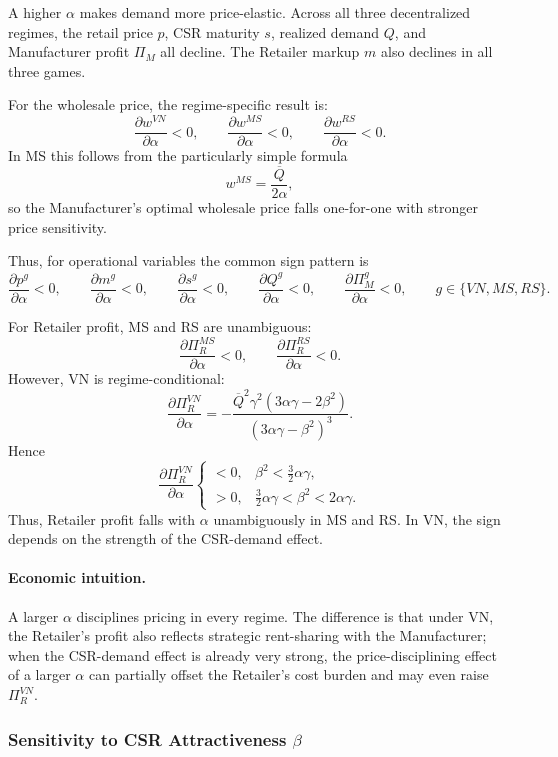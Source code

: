 A higher \(\alpha\) makes demand more price-elastic. Across all three decentralized regimes,
the retail price \(p\), CSR maturity \(s\), realized demand \(Q\), and Manufacturer profit \(\Pi_M\) all decline.
The Retailer markup \(m\) also declines in all three games.

For the wholesale price, the regime-specific result is:
\[
\frac{\partial w^{VN}}{\partial\alpha}<0,\qquad
\frac{\partial w^{MS}}{\partial\alpha}<0,\qquad
\frac{\partial w^{RS}}{\partial\alpha}<0.
\]
In MS this follows from the particularly simple formula
\[
w^{MS}=\frac{\overline Q}{2\alpha},
\]
so the Manufacturer's optimal wholesale price falls one-for-one with stronger price sensitivity.

Thus, for operational variables the common sign pattern is
\[
\frac{\partial p^g}{\partial\alpha}<0,\qquad
\frac{\partial m^g}{\partial\alpha}<0,\qquad
\frac{\partial s^g}{\partial\alpha}<0,\qquad
\frac{\partial Q^g}{\partial\alpha}<0,\qquad
\frac{\partial \Pi_M^g}{\partial\alpha}<0,
\qquad g\in\{VN,MS,RS\}.
\]

For Retailer profit, MS and RS are unambiguous:
\[
\frac{\partial \Pi_R^{MS}}{\partial\alpha}<0,\qquad
\frac{\partial \Pi_R^{RS}}{\partial\alpha}<0.
\]
However, VN is regime-conditional:
\[
\frac{\partial \Pi_R^{VN}}{\partial\alpha}
=
-\frac{\overline Q^2\gamma^2(3\alpha\gamma-2\beta^2)}{(3\alpha\gamma-\beta^2)^3}.
\]
Hence
\[
\frac{\partial \Pi_R^{VN}}{\partial\alpha}
\begin{cases}
<0, & \beta^2<\tfrac32\alpha\gamma,\\
>0, & \tfrac32\alpha\gamma<\beta^2<2\alpha\gamma.
\end{cases}
\]
Thus, Retailer profit falls with \(\alpha\) unambiguously in MS and RS. In VN, the sign depends on the strength of the CSR-demand effect.


\paragraph{Economic intuition.}
A larger \(\alpha\) disciplines pricing in every regime. The difference is that under VN,
the Retailer's profit also reflects strategic rent-sharing with the Manufacturer; when the
CSR-demand effect is already very strong, the price-disciplining effect of a larger \(\alpha\)
can partially offset the Retailer's cost burden and may even raise \(\Pi_R^{VN}\).

\subsubsection{Sensitivity to CSR Attractiveness \(\beta\)}

